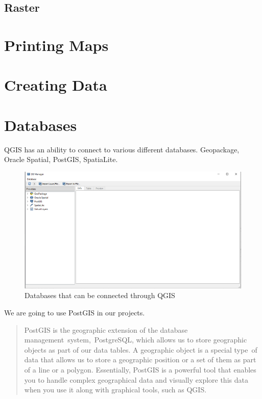\documentclass[
]{book}
\begin{document}
\hypertarget{raster}{%
\section{Raster}\label{raster}}

\hypertarget{printing-maps}{%
\chapter{Printing Maps}\label{printing-maps}}

\hypertarget{creating-data}{%
\chapter{Creating Data}\label{creating-data}}

\hypertarget{databases}{%
\chapter{Databases}\label{databases}}

QGIS has an ability to connect to various different databases. Geopackage, Oracle Spatial, PostGIS, SpatiaLite.

\begin{figure}
\centering
\includegraphics{Images/databases.png}
\caption{Databases that can be connected through QGIS}
\end{figure}

We are going to use PostGIS in our projects.

\begin{quote}
PostGIS is the geographic extension of the database management~system,~PostgreSQL, which allows us to store geographic objects as part of our data tables. A geographic object is a special type~of data that allows us to store a geographic position or a set of them as part of a line or a polygon. Essentially, PostGIS is a powerful tool that enables you to handle complex geographical data and visually explore this data when you use it along with graphical tools, such as QGIS.
\end{quote}
\end{document}
